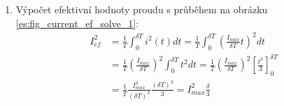     \begin{enumerate}
      \item Výpočet efektivní hodnoty proudu s průběhem na obrázku \ref{es:fig_current_ef_solve_1}:
        \begin{align}\label{es:eq_Ief1_solve}
          I_{ef}^2 &=  \frac{1}{T}\int_0^{\delta T}i^2(t)dt=
                       \frac{1}{T}\int_0^{\delta T}
                                         {\left(\frac{I_{max}}{\delta T}t\right)^2}dt   \\ \nonumber
                   &=  \frac{1}{T}\left(\frac{I_{max}}{\delta T}\right)^2
                       \int_0^{\delta T}{t^2}dt =
                       \frac{1}{T}\left(\frac{I_{max}}{\delta T}\right)^2
                                  \left[\frac{t^3}{3}\right]_0^{\delta T}               \\ \nonumber
                   &=  \frac{1}{T}\frac{I_{max}^2}{(\delta T)^2}
                       \frac{(\delta T)^3}{3}=I_{max}^2\frac{\delta}{3}
        \end{align}


\end{enumerate}
